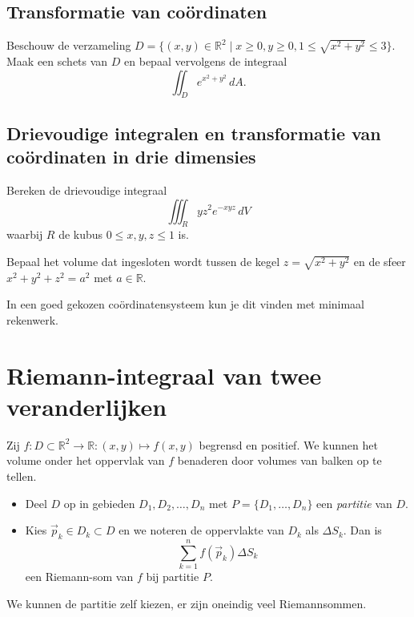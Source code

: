 \documentclass[
    10pt,
    a4paper,
    twoside,
]{report}
\begin{document}
\subsection*{Transformatie van coördinaten}

\begin{oefening}{}{}
    Beschouw de verzameling $D = \{(x,y) \in \mathbb{R}^2 \mid x \geq 0, y \geq 0, 1 \leq \sqrt{x^2 + y^2} \leq 3\}$.
    Maak een schets van $D$ en bepaal vervolgens de integraal
    \[
        \iint_D e^{x^2+y^2}\, dA.
    \]
\end{oefening}


\subsection*{Drievoudige integralen en transformatie van coördinaten in drie dimensies}
\begin{oefening}{}{}
    Bereken de drievoudige integraal
    \[
        \iiint_R yz^2 e^{-xyz}\, dV
    \] waarbij $R$ de kubus $0 \leq x, y, z \leq 1$ is.
\end{oefening}

\begin{oefening}{}{}
    Bepaal het volume dat ingesloten wordt tussen de kegel $z = \sqrt{x^2 + y^2}$ en de sfeer $x^2 + y^2 + z^2 = a^2$ met $a \in \mathbb{R}$.
    \begin{hint}{}
        In een goed gekozen coördinatensysteem kun je dit vinden met minimaal rekenwerk.
    \end{hint}
\end{oefening}


\section{Riemann-integraal van twee veranderlijken}

Zij $\displaystyle f\colon D \subset \mathbb{R}^2 \to \mathbb{R}\colon (x,y) \mapsto f(x,y)$ begrensd en positief.
We kunnen het volume onder het oppervlak van $f$ benaderen door volumes van balken op te tellen.
\begin{itemize}
    \item Deel $D$ op in gebieden $D_1, D_2, \ldots, D_n$ met $P = \{D_1, \ldots, D_n\}$ een \emph{partitie} van $D$.
    \item Kies $\vec{p}_k \in D_k \subset D$ en we noteren de oppervlakte van $D_k$ als $\Delta S_k$.
        Dan is \[
            \sum_{k=1}^{n} f(\vec{p}_k)\Delta S_k
        \] een Riemann-som van $f$ bij partitie $P$.
\end{itemize}
\begin{opmerking}{}
    We kunnen de partitie zelf kiezen, er zijn oneindig veel Riemannsommen.
\end{opmerking}
\end{document}
